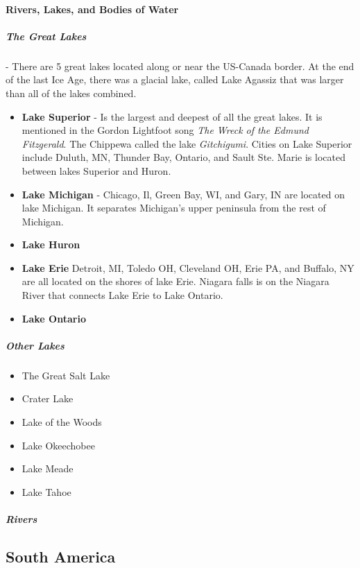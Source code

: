 			\newpage
			\paragraph{Rivers, Lakes, and Bodies of Water}
				\subparagraph{The Great Lakes} - There are 5 great lakes located along or near the US-Canada border.  At the end of the last Ice Age, there was a glacial lake, called Lake Agassiz that was larger than all of the lakes combined.  
				
				\begin{itemize}
					\item \textbf{Lake Superior} - Is the largest and deepest of all the great lakes.  It is mentioned in the Gordon Lightfoot song \textit{The Wreck of the Edmund Fitzgerald}.  The Chippewa called the lake \textit{Gitchigumi}.  Cities on Lake Superior include Duluth, MN, Thunder Bay, Ontario, and Sault Ste. Marie is located  between lakes Superior and Huron.  
					
					\item \textbf{Lake Michigan} - Chicago, Il, Green Bay, WI, and Gary, IN are located on lake Michigan.  It separates Michigan's upper peninsula from the rest of Michigan.  
					
					
					\item \textbf{Lake Huron}
					\item \textbf{Lake Erie}  Detroit, MI, Toledo OH, Cleveland OH, Erie PA, and Buffalo, NY are all located on the shores of lake Erie.  Niagara falls is on the Niagara River that connects Lake Erie to Lake Ontario.  
					
					\item \textbf{Lake Ontario}
				\end{itemize}
								
				\subparagraph{Other Lakes}
				\begin{itemize}
					
					\item{The Great Salt Lake}
					\item{Crater Lake}
					\item{Lake of the Woods}
					\item{Lake Okeechobee}
					\item{Lake Meade}
					\item{Lake Tahoe}
				\end{itemize}
				\subparagraph{Rivers}
		
			
	\subsection{South America}



